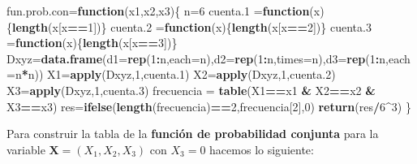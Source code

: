 \documentclass[]{book}
\newenvironment{Shaded}{\begin{snugshade}}{\end{snugshade}}
\newcommand{\ControlFlowTok}[1]{\textcolor[rgb]{0.13,0.29,0.53}{\textbf{#1}}}
\newcommand{\DataTypeTok}[1]{\textcolor[rgb]{0.13,0.29,0.53}{#1}}
\newcommand{\DecValTok}[1]{\textcolor[rgb]{0.00,0.00,0.81}{#1}}
\newcommand{\FloatTok}[1]{\textcolor[rgb]{0.00,0.00,0.81}{#1}}
\newcommand{\KeywordTok}[1]{\textcolor[rgb]{0.13,0.29,0.53}{\textbf{#1}}}
\newcommand{\NormalTok}[1]{#1}
\newcommand{\OperatorTok}[1]{\textcolor[rgb]{0.81,0.36,0.00}{\textbf{#1}}}
\newcommand{\StringTok}[1]{\textcolor[rgb]{0.31,0.60,0.02}{#1}}
\begin{document}
\begin{Shaded}
\begin{Highlighting}[]
\NormalTok{fun.prob.con=}\ControlFlowTok{function}\NormalTok{(x1,x2,x3)\{}
\NormalTok{  n=}\DecValTok{6}
\NormalTok{  cuenta}\FloatTok{.1}\NormalTok{ =}\ControlFlowTok{function}\NormalTok{(x)\{}\KeywordTok{length}\NormalTok{(x[x}\OperatorTok{==}\DecValTok{1}\NormalTok{])\}}
\NormalTok{  cuenta}\FloatTok{.2}\NormalTok{ =}\ControlFlowTok{function}\NormalTok{(x)\{}\KeywordTok{length}\NormalTok{(x[x}\OperatorTok{==}\DecValTok{2}\NormalTok{])\}}
\NormalTok{  cuenta}\FloatTok{.3}\NormalTok{ =}\ControlFlowTok{function}\NormalTok{(x)\{}\KeywordTok{length}\NormalTok{(x[x}\OperatorTok{==}\DecValTok{3}\NormalTok{])\}}
\NormalTok{  Dxyz=}\KeywordTok{data.frame}\NormalTok{(}\DataTypeTok{d1=}\KeywordTok{rep}\NormalTok{(}\DecValTok{1}\OperatorTok{:}\NormalTok{n,}\DataTypeTok{each=}\NormalTok{n),}\DataTypeTok{d2=}\KeywordTok{rep}\NormalTok{(}\DecValTok{1}\OperatorTok{:}\NormalTok{n,}\DataTypeTok{times=}\NormalTok{n),}\DataTypeTok{d3=}\KeywordTok{rep}\NormalTok{(}\DecValTok{1}\OperatorTok{:}\NormalTok{n,}\DataTypeTok{each=}\NormalTok{n}\OperatorTok{*}\NormalTok{n))}
\NormalTok{  X1=}\KeywordTok{apply}\NormalTok{(Dxyz,}\DecValTok{1}\NormalTok{,cuenta}\FloatTok{.1}\NormalTok{)}
\NormalTok{  X2=}\KeywordTok{apply}\NormalTok{(Dxyz,}\DecValTok{1}\NormalTok{,cuenta}\FloatTok{.2}\NormalTok{)}
\NormalTok{  X3=}\KeywordTok{apply}\NormalTok{(Dxyz,}\DecValTok{1}\NormalTok{,cuenta}\FloatTok{.3}\NormalTok{)}
\NormalTok{  frecuencia =}\StringTok{ }\KeywordTok{table}\NormalTok{(X1}\OperatorTok{==}\NormalTok{x1 }\OperatorTok{&}\StringTok{ }\NormalTok{X2}\OperatorTok{==}\NormalTok{x2 }\OperatorTok{&}\StringTok{ }\NormalTok{X3}\OperatorTok{==}\NormalTok{x3)}
\NormalTok{  res=}\KeywordTok{ifelse}\NormalTok{(}\KeywordTok{length}\NormalTok{(frecuencia)}\OperatorTok{==}\DecValTok{2}\NormalTok{,frecuencia[}\DecValTok{2}\NormalTok{],}\DecValTok{0}\NormalTok{)}
  \KeywordTok{return}\NormalTok{(res}\OperatorTok{/}\DecValTok{6}\OperatorTok{^}\DecValTok{3}\NormalTok{)}
\NormalTok{\}}
\end{Highlighting}
\end{Shaded}

Para construir la tabla de la \textbf{función de probabilidad conjunta} para la variable \(\mathbf{X}=(X_1,X_2,X_3)\) con \(X_3=0\) hacemos lo siguiente:
\end{document}
